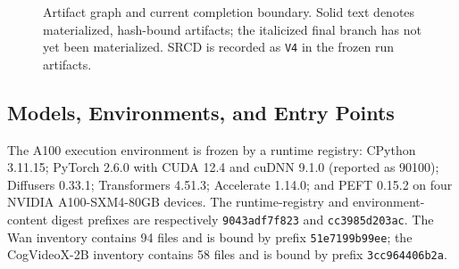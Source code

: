 \begin{figure}[H]
  \centering
  \small
  \caption{Artifact graph and current completion boundary.  Solid text denotes
  materialized, hash-bound artifacts; the italicized final branch has not yet
  been materialized.  SRCD is recorded as \texttt{V4} in the frozen run
  artifacts.}
  \label{fig:artifact-graph}
\end{figure}

\subsection{Models, Environments, and Entry Points}
\label{app:commands-environments}

The A100 execution environment is frozen by a runtime registry: CPython
3.11.15; PyTorch 2.6.0 with CUDA 12.4 and cuDNN 9.1.0 (reported as 90100); Diffusers 0.33.1;
Transformers 4.51.3; Accelerate 1.14.0; and PEFT 0.15.2 on four NVIDIA
A100-SXM4-80GB devices.  The runtime-registry and environment-content digest
prefixes are respectively \texttt{9043adf7f823} and
\texttt{cc3985d203ac}.  The Wan inventory contains 94 files and is bound by
prefix \texttt{51e7199b99ee}; the CogVideoX-2B inventory contains 58 files and
is bound by prefix \texttt{3cc964406b2a}.

